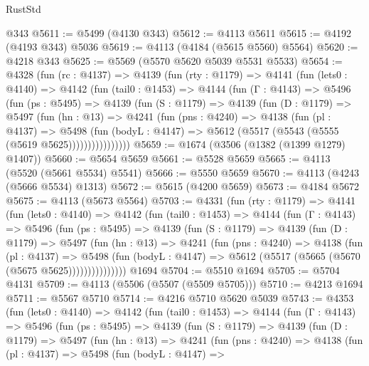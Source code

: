 \begin{lexlean}{RustStd}
\begin{coremodule}
    @343
@5611 := @5499 (@4130 @343)
@5612 := @4113 @5611
@5615 := @4192 (@4193 @343) @5036
@5619 := @4113 (@4184 (@5615 @5560) @5564)
@5620 := @4218 @343
@5625 := @5569 (@5570 @5620 @5039 @5531 @5533)
@5654 := @4328
    (fun (rc : @4137) =>
    @4139
      (fun (rty : @1179) =>
      @4141
        (fun (lets0 : @4140) =>
        @4142
          (fun (tail0 : @1453) =>
          @4144
            (fun (Γ : @4143) =>
            @5496
              (fun (ps : @5495) =>
              @4139
                (fun (S : @1179) =>
                @4139
                  (fun (D : @1179) =>
                  @5497
                    (fun (hn : @13) =>
                    @4241
                      (fun (pns : @4240) =>
                      @4138
                        (fun (pl : @4137) =>
                        @5498
                          (fun (bodyL : @4147) =>
                          @5612 (@5517 (@5543 (@5555 (@5619 @5625))))))))))))))))
@5659 := @1674 (@3506 (@1382 (@1399 @1279) @1407))
@5660 := @5654 @5659
@5661 := @5528 @5659
@5665 := @4113 (@5520 (@5661 @5534) @5541)
@5666 := @5550 @5659
@5670 := @4113 (@4243 (@5666 @5534) @1313)
@5672 := @5615 (@4200 @5659)
@5673 := @4184 @5672
@5675 := @4113 (@5673 @5564)
@5703 := @4331
    (fun (rty : @1179) =>
    @4141
      (fun (lets0 : @4140) =>
      @4142
        (fun (tail0 : @1453) =>
        @4144
          (fun (Γ : @4143) =>
          @5496
            (fun (ps : @5495) =>
            @4139
              (fun (S : @1179) =>
              @4139
                (fun (D : @1179) =>
                @5497
                  (fun (hn : @13) =>
                  @4241
                    (fun (pns : @4240) =>
                    @4138
                      (fun (pl : @4137) =>
                      @5498
                        (fun (bodyL : @4147) =>
                        @5612 (@5517 (@5665 (@5670 (@5675 @5625)))))))))))))))
    @1694
@5704 := @5510 @1694
@5705 := @5704 @4131
@5709 := @4113 (@5506 (@5507 (@5509 @5705)))
@5710 := @4213 @1694
@5711 := @5567 @5710
@5714 := @4216 @5710 @5620 @5039
@5743 := @4353
    (fun (lets0 : @4140) =>
    @4142
      (fun (tail0 : @1453) =>
      @4144
        (fun (Γ : @4143) =>
        @5496
          (fun (ps : @5495) =>
          @4139
            (fun (S : @1179) =>
            @4139
              (fun (D : @1179) =>
              @5497
                (fun (hn : @13) =>
                @4241
                  (fun (pns : @4240) =>
                  @4138
                    (fun (pl : @4137) =>
                    @5498
                      (fun (bodyL : @4147) =>

\end{coremodule}
\end{lexlean}
